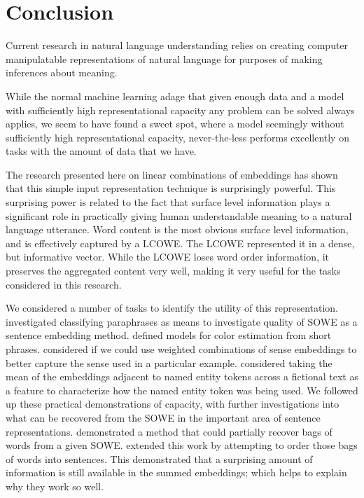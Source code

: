 \documentclass{book}
\begin{document}
\chapter{Conclusion}
Current research in natural language understanding relies on creating computer manipulatable representations of natural language for purposes of making inferences about meaning.


While the normal machine learning adage that given enough data and a model with sufficiently high representational capacity any problem can be solved always applies,
we seem to have found a sweet spot, 
where a model seemingly without sufficiently high representational capacity,
never-the-less performs excellently on tasks with the amount of data that we have.


The research presented here on linear combinations of embeddings has shown that this simple input representation technique is surprisingly powerful.
This surprising power is related to the fact that surface level information plays a significant role in practically giving human understandable meaning to a natural language utterance.
Word content is the most obvious surface level information, and is effectively captured by a LCOWE.
The LCOWE represented it in a dense, but informative vector.
While the LCOWE loses word order information, it preserves the aggregated content very well,
making it very useful for the tasks considered in this research.


We considered a number of tasks to identify the utility of this representation.
 investigated classifying paraphrases as means to investigate quality of SOWE as a sentence embedding method.
 defined models for color estimation from short phrases.
 considered if we could use weighted combinations of sense embeddings to better capture the sense used in a particular example.
 considered taking the mean of the embeddings adjacent to named entity tokens across a fictional text as a feature to characterize how the named entity token was being used.
We followed up these practical demonstrations of capacity,
with further investigations into what can be recovered from the SOWE in the important area of sentence representations.
 demonstrated a method that could partially recover bags of words from a given SOWE.
 extended this work by attempting to order those bags of words into sentences.
This demonstrated that a surprising amount of information is still available in the summed embeddings; which helps to explain why they work so well.
\end{document}
